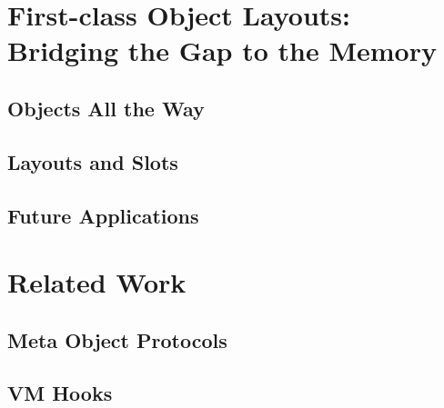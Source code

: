 \section{First-class Object Layouts: Bridging the Gap to the Memory}

\subsection{Objects All the Way}


\subsection{Layouts and Slots}


\subsection{Future Applications}


\section{Related Work}

\subsection{Meta Object Protocols}


\subsection{VM Hooks}

